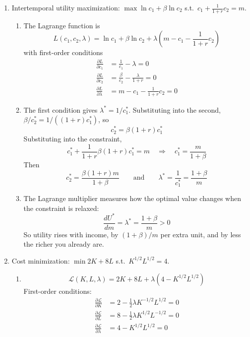 \begin{enumerate}
\item[3.] Intertemporal utility maximization: $\max \ln c_1 + \beta \ln c_2$ s.t.\ $c_1 + \frac{1}{1+r} c_2 = m$.
\begin{enumerate}
\item[(a)] The Lagrange function is
\[L(c_1, c_2, \lambda) = \ln c_1 + \beta \ln c_2 + \lambda\left(m - c_1 - \frac{1}{1+r} c_2\right)\]
with first-order conditions
\begin{align*}
\frac{\partial L}{\partial c_1} &= \frac{1}{c_1} - \lambda = 0 \\
\frac{\partial L}{\partial c_2} &= \frac{\beta}{c_2} - \frac{\lambda}{1+r} = 0 \\
\frac{\partial L}{\partial \lambda} &= m - c_1 - \frac{1}{1+r} c_2 = 0
\end{align*}

\item[(b)] The first condition gives $\lambda^* = 1/c_1^*$. Substituting into the second, $\beta / c_2^* = 1 / \left((1+r) c_1^*\right)$, so
\[c_2^* = \beta(1+r) c_1^*\]
Substituting into the constraint,
\[c_1^* + \frac{1}{1+r} \beta(1+r) c_1^* = m \quad \Rightarrow \quad c_1^* = \frac{m}{1 + \beta}\]
Then
\[c_2^* = \frac{\beta(1+r) m}{1 + \beta} \qquad \text{and} \qquad \lambda^* = \frac{1}{c_1^*} = \frac{1 + \beta}{m}\]

\item[(c)] The Lagrange multiplier measures how the optimal value changes when the constraint is relaxed:
\[\frac{dU^*}{dm} = \lambda^* = \frac{1 + \beta}{m} > 0\]
So utility rises with income, by $(1 + \beta)/m$ per extra unit, and by less the richer you already are.
\end{enumerate}

\item[4.] Cost minimization: $\min 2K + 8L$ s.t.\ $K^{1/2} L^{1/2} = 4$.
\begin{enumerate}
\item[(a)] \[\mathcal{L}(K, L, \lambda) = 2K + 8L + \lambda\left(4 - K^{1/2} L^{1/2}\right)\]
First-order conditions:
\begin{align*}
\frac{\partial \mathcal{L}}{\partial K} &= 2 - \tfrac{1}{2} \lambda K^{-1/2} L^{1/2} = 0 \\
\frac{\partial \mathcal{L}}{\partial L} &= 8 - \tfrac{1}{2} \lambda K^{1/2} L^{-1/2} = 0 \\
\frac{\partial \mathcal{L}}{\partial \lambda} &= 4 - K^{1/2} L^{1/2} = 0
\end{align*}


\end{enumerate}
\end{enumerate}
